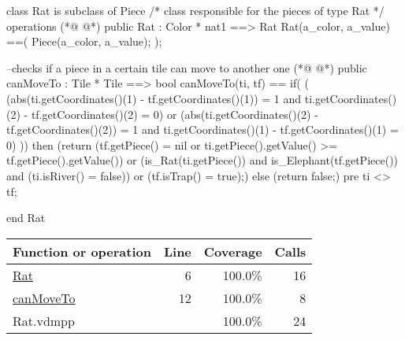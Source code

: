 \begin{vdmpp}[breaklines=true]
class Rat is subclass of Piece
/*
class responsible for the pieces of type Rat
*/
operations
(*@
\label{Rat:6}
@*)
 public Rat : Color * nat1 ==> Rat
   Rat(a_color, a_value) ==(
    Piece(a_color, a_value);
   );
   
 --checks if a piece in a certain tile can move to another one
(*@
\label{canMoveTo:12}
@*)
 public canMoveTo : Tile * Tile  ==> bool
 canMoveTo(ti, tf) 
  ==  if(
       (
       (abs(ti.getCoordinates()(1) - tf.getCoordinates()(1)) = 1 and ti.getCoordinates()(2) - tf.getCoordinates()(2) = 0) or 
       (abs(ti.getCoordinates()(2) - tf.getCoordinates()(2)) = 1 and ti.getCoordinates()(1) - tf.getCoordinates()(1) = 0)
       ))
      then (return (tf.getPiece() = nil or ti.getPiece().getValue() >= tf.getPiece().getValue()) 
      or (is_Rat(ti.getPiece()) and is_Elephant(tf.getPiece()) and (ti.isRiver() = false))
      or (tf.isTrap() = true);) 
    else (return false;)
 pre ti <> tf;
  
end Rat
\end{vdmpp}
\bigskip
\begin{longtable}{|l|r|r|r|}
\hline
Function or operation & Line & Coverage & Calls \\
\hline
\hline
\hyperref[Rat:6]{Rat} & 6&100.0\% & 16 \\
\hline
\hyperref[canMoveTo:12]{canMoveTo} & 12&100.0\% & 8 \\
\hline
\hline
Rat.vdmpp & & 100.0\% & 24 \\
\hline
\end{longtable}

